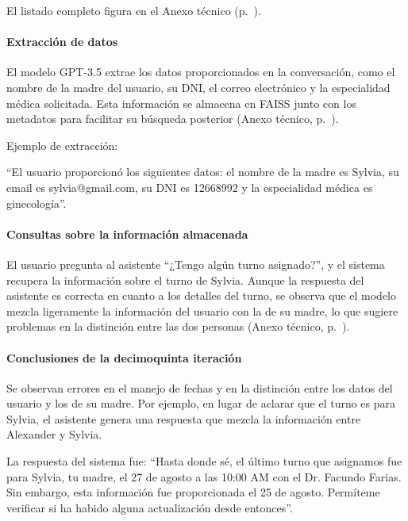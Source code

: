 El listado completo figura en el Anexo técnico (p.~\pageref{anexo:code-4-1-15-2}).

\paragraph{Extracción de datos}

El modelo GPT-3.5 extrae los datos proporcionados en la conversación, como el nombre de la madre del usuario, su DNI, el correo electrónico y la especialidad médica solicitada. Esta información se almacena en FAISS junto con los metadatos para facilitar su búsqueda posterior (Anexo técnico, p.~\pageref{anexo:code-4-1-15-3}).

Ejemplo de extracción:

``El usuario proporcionó los siguientes datos: el nombre de la madre es Sylvia, su email es sylvia@gmail.com, su DNI es 12668992 y la especialidad médica es ginecología''.

\paragraph{Consultas sobre la información almacenada}

El usuario pregunta al asistente ``¿Tengo algún turno asignado?'', y el sistema recupera la información sobre el turno de Sylvia. Aunque la respuesta del asistente es correcta en cuanto a los detalles del turno, se observa que el modelo mezcla ligeramente la información del usuario con la de su madre, lo que sugiere problemas en la distinción entre las dos personas (Anexo técnico, p.~\pageref{anexo:code-4-1-15-4}).

\paragraph{Conclusiones de la decimoquinta iteración}

Se observan errores en el manejo de fechas y en la distinción entre los datos del usuario y los de su madre. Por ejemplo, en lugar de aclarar que el turno es para Sylvia, el asistente genera una respuesta que mezcla la información entre Alexander y Sylvia.

La respuesta del sistema fue: ``Hasta donde sé, el último turno que asignamos fue para Sylvia, tu madre, el 27 de agosto a las 10:00 AM con el Dr. Facundo Farias. Sin embargo, esta información fue proporcionada el 25 de agosto. Permíteme verificar si ha habido alguna actualización desde entonces''.

